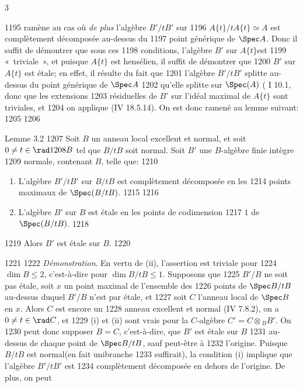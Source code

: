 3	\documentclass[10pt]{../fichiers-configuration-latex/smfart}
\begin{document}
  1195	ramène au cas où \emph{de plus} l'algèbre $B'/tB'$ sur
  1196	$A\{t\}/tA\{t\}\simeq A$ est complètement décomposée au-dessus du
  1197	point générique de $\Spec A$. Donc il suffit de démontrer que sous ces
  1198	conditions, l'algèbre $B'$ sur $A\{t\}$\pageoriginale est
  1199	« triviale », et puisque $A\{t\}$ est hensélien, il suffit de démontrer que
  1200	$B'$ sur $A\{t\}$ est étale; en effet, il résulte du fait que
  1201	l'algèbre $B'/tB'$ splitte au-dessus du point générique de $\Spec A$
  1202	qu'elle splitte sur $\Spec(A)$ ( I 10.1\sisi{)}{}, donc que les extensions
  1203	résiduelles de $B'$ sur l'idéal maximal de $A\{t\}$ sont triviales, et
  1204	on applique (\EGA IV 18.5.14). On est donc ramené au lemme suivant:
  1205	
  1206	\begin{enonce*}{Lemme 3.2}
  1207	Soit $B$ un anneau local excellent et normal, et soit $0\neq t\in \rad
  1208	B$ tel que $B/tB$ soit normal. Soit $B'$ une $B$-algèbre finie intègre
  1209	normale, contenant $B$, telle que:
  1210	\begin{enumerate}
  1211	\renewcommand{\theenumi}{\roman{enumi}}
  1212	\renewcommand{\labelenumi}{(\theenumi)}
  1213	\item L'algèbre $B'/tB'$ sur $B/tB$ est complètement décomposée en les
  1214	points maximaux de $\Spec(B/tB)$.
  1215	
  1216	\item L'algèbre $B'$ sur $B$ est étale en les points de codimension
  1217	$1$ de $\Spec(B/tB)$.
  1218	\end{enumerate}
  1219	Alors $B'$ est étale sur $B$.
  1220	\end{enonce*}
  1221	
  1222		\emph{Démonstration}. En vertu de (ii), l'assertion est triviale pour
  1224	$\dim B\leq 2$, c'est-à-dire pour $\dim B/tB\leq 1$. Supposons que
  1225	$B'/B$ ne soit pas étale, soit $x$ un point maximal de l'ensemble des
  1226	points de $\Spec B/tB$ au-dessus duquel $B'/B$ n'est par étale, et
  1227	soit $C$ l'anneau local de $\Spec B$ en $x$. Alors $C$ est encore un
  1228	anneau excellent et normal (\EGA IV 7.8.2), on a $0\neq t\in\rad C$, et
  1229	(i) et (ii) sont vrais pour la $C$-algèbre $C'=C\otimes {}_BB'$. On
  1230	peut donc supposer $B=C$, c'est-à-dire, que $B'$ est étale sur $B$
  1231	au-dessus de chaque point de $\Spec B/tB$, sauf peut-être à
  1232	l'origine. Puisque $B/tB$ est normal\pageoriginale (en fait unibranche
  1233	suffirait), la condition (i) implique que l'algèbre $B'/tB'$ est
  1234	complètement décomposée en dehors de l'origine. De plus, on peut
\end{document}
